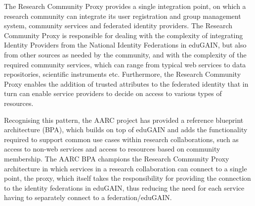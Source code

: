 \documentclass[fleqn,11pt]{wlscirep}
\begin{document}
{The Research Community Proxy provides a single integration point, on which a research community can integrate its user registration and group management system, community services and federated identity providers. The Research Community Proxy is responsible for dealing with the complexity of integrating Identity Providers from the National Identity Federations in eduGAIN, but also from other sources as needed by the community, and with the complexity of the required community services, which can range from typical web services to data repositories, scientific instruments etc. Furthermore, the Research Community Proxy enables the addition of trusted attributes to the federated identity that in turn can enable service providers to decide on access to various types of resources.

Recognising this pattern, the AARC project has provided a reference blueprint architecture (BPA)\cite{aarcbpa}, which builds on top of eduGAIN and adds the functionality required to support common use cases within research collaborations, such as access to non-web services and access to resources based on community membership. The AARC BPA champions the Research Community Proxy architecture in which services in a research collaboration can connect to a single point, the proxy, which itself takes the responsibility for providing the connection to the identity federations in eduGAIN, thus reducing the need for each service having to separately connect to a federation/eduGAIN. 

}
\end{document}
